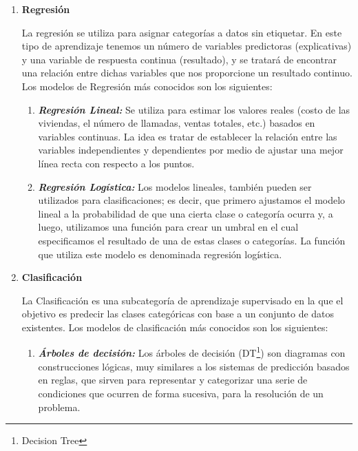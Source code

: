 \begin{enumerate}[label=\textbf{\arabic*})]
	
	\item \textbf{Regresión}
	
	La regresión se utiliza para asignar categorías a datos sin etiquetar. En este tipo de aprendizaje tenemos un número de variables predictoras (explicativas) y una variable de respuesta continua (resultado), y se tratará de encontrar una relación entre dichas variables que nos proporcione un resultado continuo\cite{Roman2019}. Los modelos de Regresión más conocidos son los siguientes:
	\begin{enumerate}[label=\textbf{(\alph*)}]
		\item \textit{\textbf{Regresión Lineal:}}
		Se utiliza para estimar los valores reales (costo de las viviendas, el número de llamadas, ventas totales, etc.) basados en variables continuas. La idea es tratar de establecer la relación entre las variables independientes y dependientes por medio de ajustar una mejor línea recta con respecto a los puntos\cite{BriegaLopez2015}. 
		
		\item \textit{\textbf{Regresión Logística:}}
		Los modelos lineales, también pueden ser utilizados para clasificaciones; es decir, que primero ajustamos el modelo lineal a la probabilidad de que una cierta clase o categoría ocurra y, a luego, utilizamos una función para crear un umbral en el cual especificamos el resultado de una de estas clases o categorías. La función que utiliza este modelo es denominada regresión logística\cite{BriegaLopez2015}.  
	\end{enumerate}
	
	\newpage
	\item \textbf{Clasificación}
	
	La Clasificación es una subcategoría de aprendizaje supervisado en la que el objetivo es predecir las clases categóricas con base a un conjunto de datos existentes\cite{BriegaLopez2015}. Los modelos de clasificación más conocidos son los siguientes:
	
	\begin{enumerate}[label=\textbf{(\alph*)}]
		\item \textit{\textbf{Árboles de decisión:}}
		Los árboles de decisión (DT\footnote{Decision Tree}) son diagramas con construcciones lógicas, muy similares a los sistemas de predicción basados en reglas, que sirven para representar y categorizar una serie de condiciones que ocurren de forma sucesiva, para la resolución de un problema\cite{Roman2019}. 
		

\end{enumerate}
\end{enumerate}
